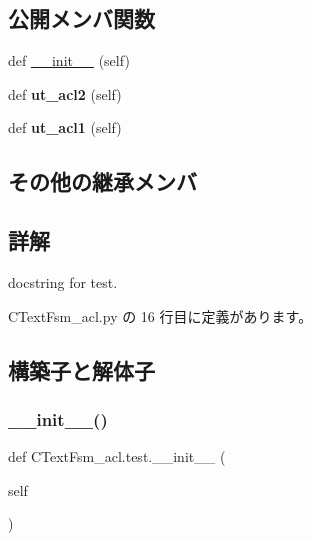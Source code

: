 \subsection*{公開メンバ関数}
\begin{DoxyCompactItemize}
\item 
def \mbox{\hyperlink{classCTextFsm__acl_1_1test_a8d24ace55d8eae0649e764d4ae4ac882}{\+\_\+\+\_\+init\+\_\+\+\_\+}} (self)
\item 
\mbox{\label{classCTextFsm__acl_1_1test_a82a57b6fb5d09e72da05c016235dade6}} 
def {\bfseries ut\+\_\+acl2} (self)
\item 
\mbox{\label{classCTextFsm__acl_1_1test_a04d12888dbaefa17eca079c426772990}} 
def {\bfseries ut\+\_\+acl1} (self)
\end{DoxyCompactItemize}
\subsection*{その他の継承メンバ}


\subsection{詳解}
\begin{DoxyVerb}docstring for test.\end{DoxyVerb}
 

 C\+Text\+Fsm\+\_\+acl.\+py の 16 行目に定義があります。



\subsection{構築子と解体子}
\mbox{\label{classCTextFsm__acl_1_1test_a8d24ace55d8eae0649e764d4ae4ac882}} 
\subsubsection{\texorpdfstring{\_\_init\_\_()}{\_\_init\_\_()}}
{\footnotesize\ttfamily def C\+Text\+Fsm\+\_\+acl.\+test.\+\_\+\+\_\+init\+\_\+\+\_\+ (\begin{DoxyParamCaption}\item[{}]{self }\end{DoxyParamCaption})}

